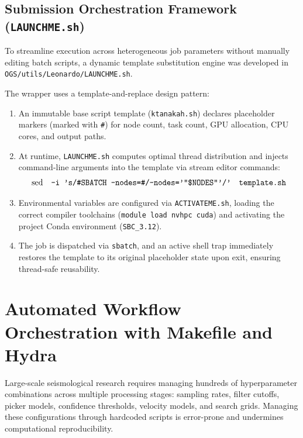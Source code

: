 \subsection{Submission Orchestration Framework (\texttt{LAUNCHME.sh})}
To streamline execution across heterogeneous job parameters without
manually editing batch scripts, a dynamic template substitution
engine was developed in \texttt{OGS/utils/Leonardo/LAUNCHME.sh}.

The wrapper uses a template-and-replace design pattern:
\begin{enumerate}
  \item An immutable base script template (\texttt{ktanakah.sh})
    declares placeholder markers (marked with \texttt{\#}) for node
    count, task count, \ac{GPU} allocation, \ac{CPU} cores, and output paths.
  \item At runtime, \texttt{LAUNCHME.sh} computes optimal thread
    distribution and injects command-line arguments into the
    template via stream editor commands:
    \begin{equation}
      \mathrm{sed} \quad \text{\texttt{-i 's/\#SBATCH
      --nodes=\#/--nodes='"\$NODES"'/'}} \quad \text{\texttt{template.sh}}
    \end{equation}
  \item Environmental variables are configured via
    \texttt{ACTIVATEME.sh}, loading the correct compiler toolchains
    (\texttt{module load nvhpc cuda}) and activating the project
    Conda environment (\texttt{SBC\_3.12}).
  \item The job is dispatched via \texttt{sbatch}, and an active
    shell trap immediately restores the template to its original
    placeholder state upon exit, ensuring thread-safe reusability.
\end{enumerate}

\section{Automated Workflow Orchestration with Makefile and Hydra}
\label{sec:orchestration}

Large-scale seismological research requires managing hundreds of
hyperparameter combinations across multiple processing stages:
sampling rates, filter cutoffs, picker models, confidence
thresholds, velocity models, and search grids. Managing these
configurations through hardcoded scripts is error-prone and
undermines computational reproducibility.

